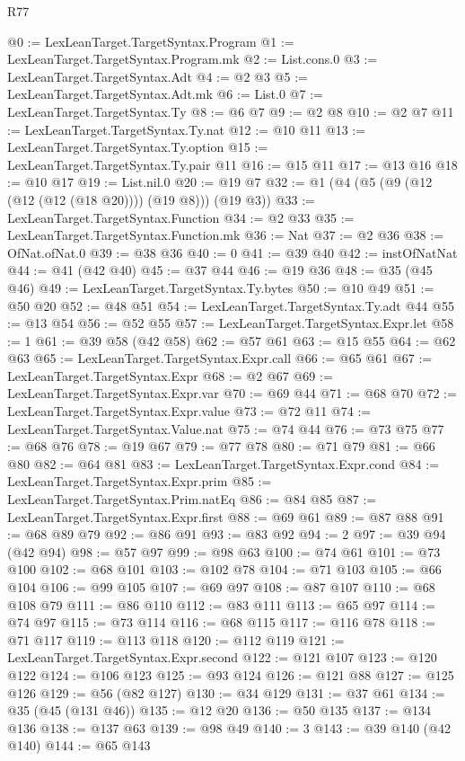 \begin{lexlean}{R77}
\begin{coremodule}
@0 := LexLeanTarget.TargetSyntax.Program
@1 := LexLeanTarget.TargetSyntax.Program.mk
@2 := List.cons.{0}
@3 := LexLeanTarget.TargetSyntax.Adt
@4 := @2 @3
@5 := LexLeanTarget.TargetSyntax.Adt.mk
@6 := List.{0}
@7 := LexLeanTarget.TargetSyntax.Ty
@8 := @6 @7
@9 := @2 @8
@10 := @2 @7
@11 := LexLeanTarget.TargetSyntax.Ty.nat
@12 := @10 @11
@13 := LexLeanTarget.TargetSyntax.Ty.option
@15 := LexLeanTarget.TargetSyntax.Ty.pair @11
@16 := @15 @11
@17 := @13 @16
@18 := @10 @17
@19 := List.nil.{0}
@20 := @19 @7
@32 := @1 (@4 (@5 (@9 (@12 (@12 (@12 (@18 @20)))) (@19 @8))) (@19 @3))
@33 := LexLeanTarget.TargetSyntax.Function
@34 := @2 @33
@35 := LexLeanTarget.TargetSyntax.Function.mk
@36 := Nat
@37 := @2 @36
@38 := OfNat.ofNat.{0}
@39 := @38 @36
@40 := 0
@41 := @39 @40
@42 := instOfNatNat
@44 := @41 (@42 @40)
@45 := @37 @44
@46 := @19 @36
@48 := @35 (@45 @46)
@49 := LexLeanTarget.TargetSyntax.Ty.bytes
@50 := @10 @49
@51 := @50 @20
@52 := @48 @51
@54 := LexLeanTarget.TargetSyntax.Ty.adt @44
@55 := @13 @54
@56 := @52 @55
@57 := LexLeanTarget.TargetSyntax.Expr.let
@58 := 1
@61 := @39 @58 (@42 @58)
@62 := @57 @61
@63 := @15 @55
@64 := @62 @63
@65 := LexLeanTarget.TargetSyntax.Expr.call
@66 := @65 @61
@67 := LexLeanTarget.TargetSyntax.Expr
@68 := @2 @67
@69 := LexLeanTarget.TargetSyntax.Expr.var
@70 := @69 @44
@71 := @68 @70
@72 := LexLeanTarget.TargetSyntax.Expr.value
@73 := @72 @11
@74 := LexLeanTarget.TargetSyntax.Value.nat
@75 := @74 @44
@76 := @73 @75
@77 := @68 @76
@78 := @19 @67
@79 := @77 @78
@80 := @71 @79
@81 := @66 @80
@82 := @64 @81
@83 := LexLeanTarget.TargetSyntax.Expr.cond
@84 := LexLeanTarget.TargetSyntax.Expr.prim
@85 := LexLeanTarget.TargetSyntax.Prim.natEq
@86 := @84 @85
@87 := LexLeanTarget.TargetSyntax.Expr.first
@88 := @69 @61
@89 := @87 @88
@91 := @68 @89 @79
@92 := @86 @91
@93 := @83 @92
@94 := 2
@97 := @39 @94 (@42 @94)
@98 := @57 @97
@99 := @98 @63
@100 := @74 @61
@101 := @73 @100
@102 := @68 @101
@103 := @102 @78
@104 := @71 @103
@105 := @66 @104
@106 := @99 @105
@107 := @69 @97
@108 := @87 @107
@110 := @68 @108 @79
@111 := @86 @110
@112 := @83 @111
@113 := @65 @97
@114 := @74 @97
@115 := @73 @114
@116 := @68 @115
@117 := @116 @78
@118 := @71 @117
@119 := @113 @118
@120 := @112 @119
@121 := LexLeanTarget.TargetSyntax.Expr.second
@122 := @121 @107
@123 := @120 @122
@124 := @106 @123
@125 := @93 @124
@126 := @121 @88
@127 := @125 @126
@129 := @56 (@82 @127)
@130 := @34 @129
@131 := @37 @61
@134 := @35 (@45 (@131 @46))
@135 := @12 @20
@136 := @50 @135
@137 := @134 @136
@138 := @137 @63
@139 := @98 @49
@140 := 3
@143 := @39 @140 (@42 @140)
@144 := @65 @143

\end{coremodule}
\end{lexlean}
